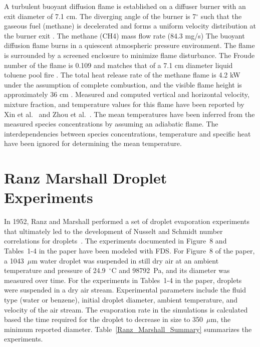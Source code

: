 A turbulent buoyant diffusion flame is established on a diffuser burner with an exit diameter of 7.1 cm. The diverging angle of the burner is 7$^\circ$ such that the gaseous fuel (methane) is decelerated and forms a uniform velocity distribution at the burner exit \cite{Xin:CF2005}. The methane (CH4) mass flow rate (84.3 mg/s) The buoyant diffusion flame burns in a quiescent atmospheric pressure environment. The flame is surrounded by a screened enclosure to minimize flame disturbance. The Froude number of the flame is 0.109 and matches that of a 7.1 cm diameter liquid toluene pool fire \cite{Xin:CF2005,Zhou:CS1998}. The total heat release rate of the methane flame is 4.2 kW under the assumption of complete combustion, and the visible flame height is approximately 36 cm \cite{Xin:CF2005}. Measured and computed vertical and horizontal velocity, mixture fraction, and temperature values for this flame have been reported by Xin et al.~\cite{Xin:CF2005,Xin:PhD2002} and Zhou et al.~\cite{Zhou:CS1998,Zhou:PurduePhD1999}. The mean temperatures have been inferred from the measured species concentrations \cite{Xin:CF2005} by assuming an adiabatic flame. The interdependencies between species concentrations, temperature and specific heat have been ignored for determining the mean temperature.

\section{Ranz Marshall Droplet Experiments}
\label{Ranz_Marshall_Description}

In 1952, Ranz and Marshall performed a set of droplet evaporation experiments that ultimately led to the development of Nusselt and Schmidt number correlations for droplets~\cite{Ranz}. The experiments documented in Figure~8 and Tables~1-4 in the paper have been modeled with FDS. For Figure~8 of the paper, a 1043~$\mu$m water droplet was suspended in still dry air at an ambient temperature and pressure of 24.9~$^\circ$C and 98792~Pa, and its diameter was measured over time. For the experiments in Tables~1-4 in the paper, droplets were suspended in a dry air stream. Experimental parameters include the fluid type (water or benzene), initial droplet diameter, ambient temperature, and velocity of the air stream. The evaporation rate in the simulations is calculated based the time required for the droplet to decrease in size to 350~$\mu$m, the minimum reported diameter. Table~\ref{Ranz_Marshall_Summary} summarizes the experiments.

